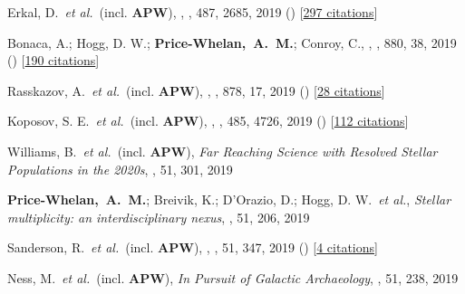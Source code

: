 {\item[{\color{deemph}\scriptsize56}]Erkal, D.~\textit{et al.}~(incl. \textbf{APW}), , \mnras, 487, 2685, 2019 () [\href{http://adsabs.harvard.edu/abs/2019MNRAS.487.2685E}{297 citations}]

\item[{\color{deemph}\scriptsize55}]Bonaca, A.; Hogg, D. W.; \textbf{Price-Whelan,~A.~M.}; Conroy, C., , \apj, 880, 38, 2019 () [\href{http://adsabs.harvard.edu/abs/2019ApJ...880...38B}{190 citations}]

\item[{\color{deemph}\scriptsize54}]Rasskazov, A.~\textit{et al.}~(incl. \textbf{APW}), , \apj, 878, 17, 2019 () [\href{http://adsabs.harvard.edu/abs/2019ApJ...878...17R}{28 citations}]

\item[{\color{deemph}\scriptsize53}]Koposov, S. E.~\textit{et al.}~(incl. \textbf{APW}), , \mnras, 485, 4726, 2019 () [\href{http://adsabs.harvard.edu/abs/2019MNRAS.485.4726K}{112 citations}]

\item[{\color{deemph}\scriptsize52}]Williams, B.~\textit{et al.}~(incl. \textbf{APW}), \textit{Far Reaching Science with Resolved Stellar Populations in the 2020s}, \baas, 51, 301, 2019

\item[{\color{deemph}\scriptsize51}]\textbf{Price-Whelan,~A.~M.}; Breivik, K.; D'Orazio, D.; Hogg, D. W.~\textit{et al.}, \textit{Stellar multiplicity: an interdisciplinary nexus}, \baas, 51, 206, 2019

\item[{\color{deemph}\scriptsize50}]Sanderson, R.~\textit{et al.}~(incl. \textbf{APW}), , \baas, 51, 347, 2019 () [\href{http://adsabs.harvard.edu/abs/2019BAAS...51c.347S}{4 citations}]

\item[{\color{deemph}\scriptsize49}]Ness, M.~\textit{et al.}~(incl. \textbf{APW}), \textit{In Pursuit of Galactic Archaeology}, \baas, 51, 238, 2019

}
